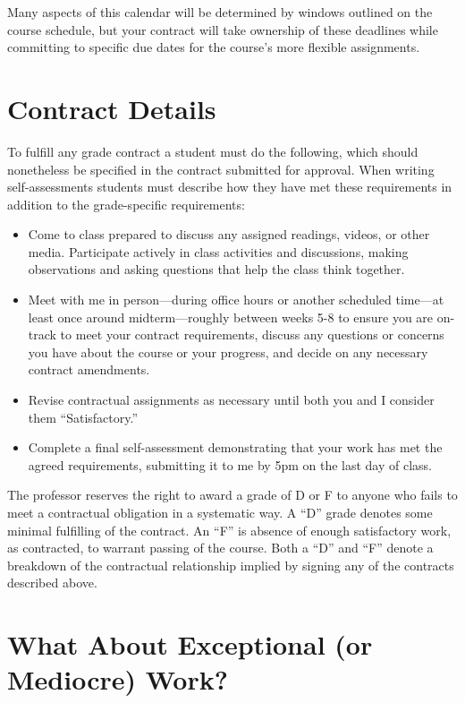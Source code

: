 Many aspects of this calendar will be determined by windows outlined on the course schedule, but your contract will take ownership of these deadlines while committing to specific due dates for the course's more flexible assignments.

\hypertarget{contract-details}{%
\section*{Contract Details}\label{contract-details}}


To fulfill any grade contract a student must do the following, which should nonetheless be specified in the contract submitted for approval. When writing self-assessments students must describe how they have met these requirements in addition to the grade-specific requirements:

\begin{itemize}
\item
  Come to class prepared to discuss any assigned readings, videos, or other media. Participate actively in class activities and discussions, making observations and asking questions that help the class think together.
\item
  Meet with me in person---during office hours or another scheduled time---at least once around midterm---roughly between weeks 5-8 to ensure you are on-track to meet your contract requirements, discuss any questions or concerns you have about the course or your progress, and decide on any necessary contract amendments.
\item
  Revise contractual assignments as necessary until both you and I consider them ``Satisfactory.''
\item
  Complete a final self-assessment demonstrating that your work has met the agreed requirements, submitting it to me by 5pm on the last day of class.
\end{itemize}

The professor reserves the right to award a grade of D or F to anyone who fails to meet a contractual obligation in a systematic way. A ``D'' grade denotes some minimal fulfilling of the contract. An ``F'' is absence of enough satisfactory work, as contracted, to warrant passing of the course. Both a ``D'' and ``F'' denote a breakdown of the contractual relationship implied by signing any of the contracts described above.

\hypertarget{what-about-exceptional-or-mediocre-work}{%
\section*{What About Exceptional (or Mediocre) Work?}\label{what-about-exceptional-or-mediocre-work}}


